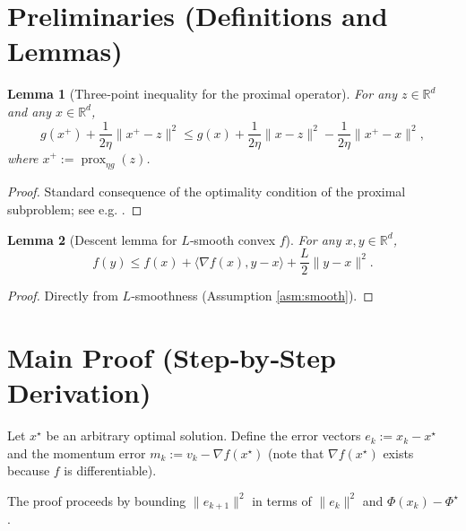 \documentclass{article}
\newtheorem{lemma}{Lemma}
\newcommand{\prox}{\operatorname{prox}}
\newcommand{\grad}{\nabla}
\newcommand{\R}{\mathbb{R}}
\begin{document}
\newpage
\section*{Preliminaries (Definitions and Lemmas)}
\begin{lemma}[Three‑point inequality for the proximal operator]\label{lem:prox}
For any $z\in\R^{d}$ and any $x\in\R^{d}$,
\[
g(x^{+})+ \frac{1}{2\eta}\|x^{+}-z\|^{2}
\le g(x)+\frac{1}{2\eta}\|x-z\|^{2}
-\frac{1}{2\eta}\|x^{+}-x\|^{2},
\]
where $x^{+}:=\prox_{\eta g}(z)$.
\end{lemma}
\begin{proof}
Standard consequence of the optimality condition of the proximal subproblem; see e.g. \cite{Parikh2014}.
\end{proof}

\begin{lemma}[Descent lemma for $L$‑smooth convex $f$]\label{lem:smooth}
For any $x,y\in\R^{d}$,
\[
f(y)\le f(x)+\langle\grad f(x),y-x\rangle+\frac{L}{2}\|y-x\|^{2}.
\]
\end{lemma}
\begin{proof}
Directly from $L$‑smoothness (Assumption \ref{asm:smooth}).
\end{proof}

\section*{Main Proof (Step‑by‑Step Derivation)}
Let $x^{\star}$ be an arbitrary optimal solution.  
Define the error vectors $e_{k}:=x_{k}-x^{\star}$ and the momentum error $m_{k}:=v_{k}-\grad f(x^{\star})$ (note that $\grad f(x^{\star})$ exists because $f$ is differentiable).  

The proof proceeds by bounding $\|e_{k+1}\|^{2}$ in terms of $\|e_{k}\|^{2}$ and $\Phi(x_{k})-\Phi^{\star}$.
\end{document}
